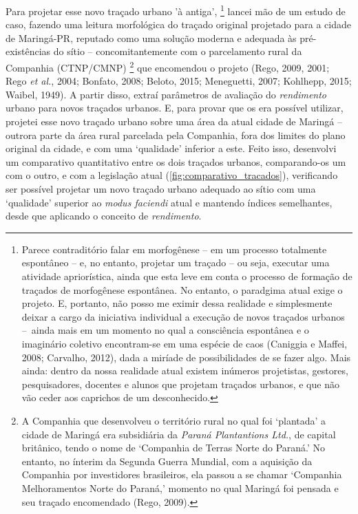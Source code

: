 \documentclass[12pt, a4paper]{book} %
\begin{document}
        Para projetar esse novo traçado urbano 'à antiga',
            \footnote[2]{Parece contraditório falar em morfogênese – em um processo totalmente espontâneo – e, no entanto, projetar um traçado – ou seja, executar uma atividade apriorística, ainda que esta leve em conta o processo de formação de traçados de morfogênese espontânea. No entanto, o paradgima atual exige o projeto. E, portanto, não posso me eximir dessa realidade e simplesmente deixar a cargo da iniciativa individual a execução de novos traçados urbanos – ainda mais em um momento no qual a consciência espontânea e o imaginário coletivo encontram-se em uma espécie de caos (Caniggia e Maffei, 2008; Carvalho, 2012), dada a miríade de possibilidades de se fazer algo. Mais ainda: dentro da nossa realidade atual existem inúmeros projetistas, gestores, pesquisadores, docentes e alunos que projetam traçados urbanos, e que não vão ceder aos caprichos de um desconhecido.} 
        lancei mão de um estudo de caso, fazendo uma leitura morfológica do traçado original projetado para a cidade de Maringá-PR, reputado como uma solução moderna e adequada às pré-existências do sítio – concomitantemente com o parcelamento rural da Companhia (CTNP/CMNP)
            \footnote[3]{A Companhia que desenvolveu o território rural no qual foi `plantada' a cidade de Maringá era subsidiária da \textit{Paraná Plantantions Ltd.}, de capital britânico, tendo o nome de `Companhia de Terras Norte do Paraná.' No entanto, no ínterim da Segunda Guerra Mundial, com a aquisição da Companhia por investidores brasileiros, ela passou a se chamar `Companhia Melhoramentos Norte do Paraná,' momento no qual Maringá foi pensada e seu traçado encomendado (Rego, 2009).} 
        que encomendou o projeto (Rego, 2009, 2001; Rego \textit{et al.}, 2004; Bonfato, 2008; Beloto, 2015; Meneguetti, 2007; Kohlhepp, 2015; Waibel, 1949). A partir disso, extraí parâmetros de avaliação do \textit{rendimento} urbano para novos traçados urbanos. E, para provar que os era possível utilizar, projetei esse novo traçado urbano sobre uma área da atual cidade de Maringá – outrora parte da área rural parcelada pela Companhia, fora dos limites do plano original da cidade, e com uma `qualidade' inferior a este. Feito isso, desenvolvi um comparativo quantitativo entre os dois traçados urbanos, comparando-os um com o outro, e com a legislação atual (\autoref{fig:comparativo_tracados}), verificando ser possível projetar um novo traçado urbano adequado ao sítio com uma `qualidade' superior ao \textit{modus faciendi} atual e mantendo índices semelhantes, desde que aplicando o conceito de \textit{rendimento}.
\end{document}
